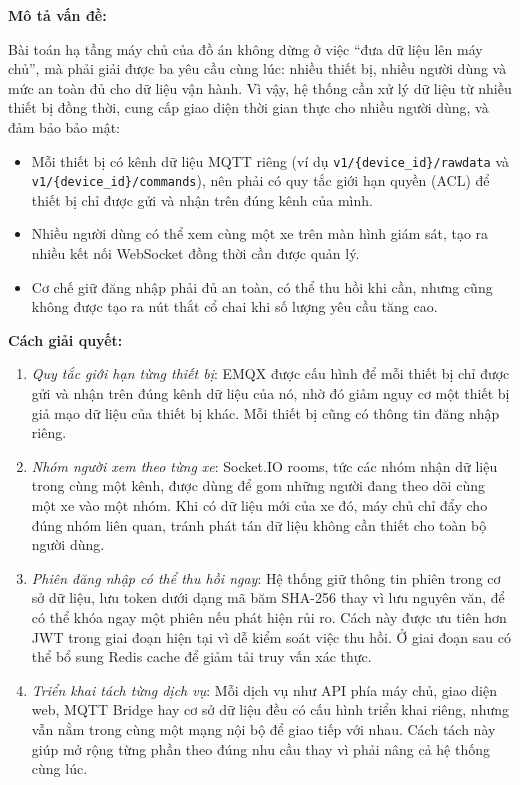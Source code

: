 \documentclass[a4paper]{extarticle}
\providecommand{\tightlist}{%
  \setlength{\itemsep}{0pt}\setlength{\parskip}{0pt}}
\begin{document}
\textbf{Mô tả vấn đề:}

Bài toán hạ tầng máy chủ của đồ án không dừng ở việc ``đưa dữ liệu lên
máy chủ'',
mà phải giải được ba yêu cầu cùng lúc: nhiều thiết bị, nhiều người dùng
và mức an toàn đủ cho dữ liệu vận hành. Vì vậy, hệ thống cần xử lý dữ
liệu từ nhiều thiết bị đồng thời, cung cấp giao diện thời gian thực cho
nhiều người dùng, và đảm bảo bảo mật:

\begin{itemize}
\tightlist
\item
  Mỗi thiết bị có kênh dữ liệu MQTT riêng (ví dụ
  \texttt{v1/\{device\_id\}/rawdata} và
  \texttt{v1/\{device\_id\}/commands}), nên phải có quy tắc giới hạn
  quyền (ACL) để thiết bị chỉ được gửi và nhận trên đúng kênh của mình.
\item
  Nhiều người dùng có thể xem cùng một xe trên màn hình giám sát, tạo ra nhiều
  kết nối WebSocket đồng thời cần được quản lý.
\item
  Cơ chế giữ đăng nhập phải đủ an toàn, có thể thu hồi khi cần, nhưng
  cũng không được tạo ra nút thắt cổ chai khi số lượng yêu cầu tăng cao.
\end{itemize}

\textbf{Cách giải quyết:}

\begin{enumerate}
\def\labelenumi{\arabic{enumi}.}
\tightlist
\item
  \emph{Quy tắc giới hạn từng thiết bị}: EMQX được cấu hình để mỗi thiết
  bị chỉ được gửi và nhận trên đúng kênh dữ liệu của nó, nhờ đó giảm
  nguy cơ một thiết bị giả mạo dữ liệu của thiết bị khác. Mỗi thiết bị
  cũng có thông tin đăng nhập riêng.
\item
  \emph{Nhóm người xem theo từng xe}: Socket.IO rooms, tức các nhóm nhận
  dữ liệu trong cùng một kênh, được dùng để gom những người đang theo
  dõi cùng một xe vào một nhóm. Khi có dữ liệu mới của xe đó, máy chủ
  chỉ đẩy cho đúng nhóm liên quan, tránh phát tán
  dữ liệu không cần thiết cho toàn bộ người dùng.
\item
  \emph{Phiên đăng nhập có thể thu hồi ngay}: Hệ thống giữ thông tin
  phiên trong cơ sở dữ liệu, lưu token dưới dạng mã băm SHA-256 thay vì
  lưu nguyên văn, để có thể khóa ngay một phiên nếu phát hiện rủi ro.
  Cách này được ưu tiên hơn JWT trong giai đoạn hiện tại vì dễ kiểm soát
  việc thu hồi. Ở giai đoạn sau có thể bổ sung Redis cache để giảm tải
  truy vấn xác thực.
\item
  \emph{Triển khai tách từng dịch vụ}: Mỗi dịch vụ như API phía máy chủ,
  giao diện web, MQTT Bridge hay cơ sở dữ liệu đều có cấu hình triển khai
  riêng, nhưng vẫn nằm trong cùng một mạng nội bộ để giao tiếp với nhau.
  Cách tách này giúp mở rộng từng phần theo đúng nhu cầu thay vì phải
  nâng cả hệ thống cùng lúc.
\end{enumerate}
\end{document}
